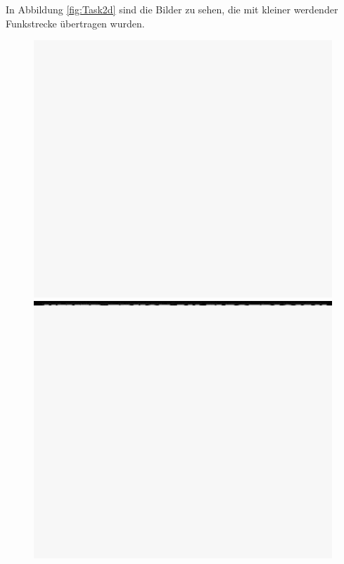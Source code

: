In Abbildung \ref{fig:Task2d} sind die Bilder zu sehen, die mit kleiner werdender Funkstrecke übertragen wurden.
\begin{figure}[H]
    \begin{minipage}{0.45\textwidth}
            \centering
            \includegraphics[width=\linewidth]{Pictures/grosserAbstand.jpg}
        \end{minipage}
        \hfill
        \begin{minipage}{0.45\textwidth}
            \centering
            \includegraphics[width=\linewidth]{Pictures/wenigergrosserabstand.jpg}
        \end{minipage}


\end{figure}
